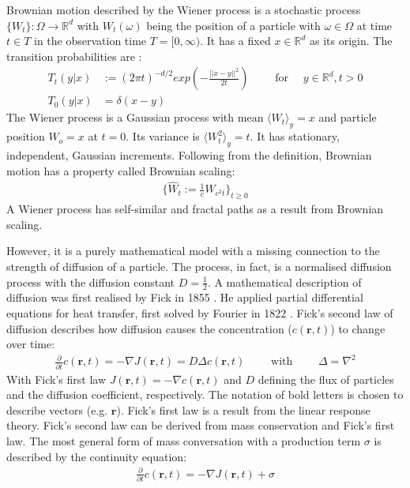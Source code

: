 \documentclass[
  a4paper,BCOR10mm,oneside,
  headsepline,footsepline,%
  fleqn,openbib
]{scrbook}
\begin{document}
Brownian motion described by the Wiener process is a stochastic process $ \{ W_t \}: \Omega \rightarrow \mathbb{R}^d$ with $ W_t(\omega)$ being the position of a particle with $\omega \in \Omega$ at time $t \in T$ in the observation time $T =[0, \infty)$. It has a fixed $x \in \mathbb{R}^d$ as its origin. The transition probabilities are \cite{LectureFelix}: 
\begin{align}
T_{t}(y|x) & := (2 \pi t)^{-d/2} exp \left(- \frac{||x-y||^2}{2 t}\right) \qquad  \text{ for } \quad y \in \mathbb{R}^d, t>0 \\ \nonumber
T_{0}(y|x) & = \delta(x-y) 
\end{align}
The Wiener process is a Gaussian process with mean $\langle W_t \rangle_y=x$ and particle position $W_o=x$ at $t=0$. Its variance is $\langle W^2_t \rangle_y= t$. It has stationary, independent, Gaussian increments. Following from the definition, Brownian motion has a property called Brownian scaling:
\begin{align}
\label{Brownianscaling}
\{\hat{W}_t := \frac{1}{c} W_{c^2 t} \}_{t\geq0} 
\end{align}
A Wiener process has self-similar and fractal paths as a result from Brownian scaling.\par\bigskip
However, it is a purely mathematical model with a missing connection to the strength of diffusion of a particle. The process, in fact, is a normalised diffusion process with the diffusion constant $D=\frac{1}{2}$. A mathematical description of diffusion was first realised by Fick in 1855 \cite{Fick1855}. He applied partial differential equations for heat transfer, first solved by Fourier in 1822 \cite{Fourier1822}. Fick's  second law of diffusion describes how diffusion causes the concentration ($c(\bm{r},t)$) to change over time:
\begin{align}
 \frac{\partial}{\partial t} c(\bm{r},t) = - \nabla J (\bm{r},t) = D  \Delta c(\bm{r},t) \qquad \text{ with } \qquad \Delta= \nabla^2  \label{eq:ficks}
\end{align}
With Fick's first law $J(\bm{r},t)=- \nabla c(\bm{r},t)$ and $D$ defining the flux of particles and the diffusion coefficient, respectively. The notation of bold letters is chosen to describe vectors (e.g. $\bm{r}$). Fick's first law is a result from the linear response theory. Fick's second law can be derived from mass conservation and Fick's first law. The most general form of mass conversation with a production term $\sigma$ is described by the continuity equation:
\begin{align} \label{continuity}
\frac{\partial}{\partial t} c(\bm{r},t)=- \nabla J(\bm{r},t)+ \sigma 
\end{align}
\end{document}
